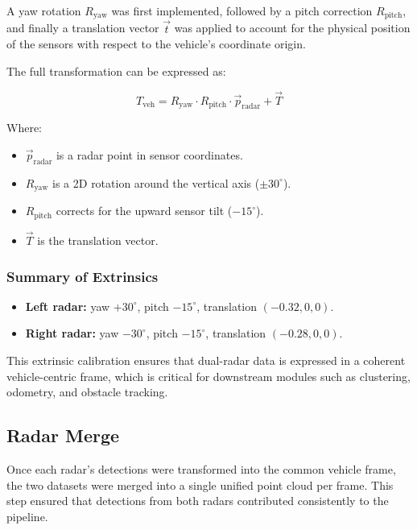 A yaw rotation \( R_{\text{yaw}} \) was first implemented, followed by a pitch correction \( R_{\text{pitch}} \), and finally a translation vector \( \vec{t} \) was applied to account for the physical position of the sensors with respect to the vehicle's coordinate origin.

The full transformation can be expressed as:

\begin{equation}
T_{\text{veh}} = R_{\text{yaw}} \cdot R_{\text{pitch}} \cdot \vec{p}_{\text{radar}} + \vec{T}
\label{eq:radar_to_vehicle_transform}
\end{equation}

Where:
\begin{itemize}
    \item \( \vec{p}_{\text{radar}} \) is a radar point in sensor coordinates.
    \item \( R_{\text{yaw}} \) is a 2D rotation around the vertical axis ($\pm30^\circ$).
    \item \( R_{\text{pitch}} \) corrects for the upward sensor tilt ($-15^\circ$).
    \item \( \vec{T} \) is the translation vector.
\end{itemize}

\subsubsection{Summary of Extrinsics}
\begin{itemize}
    \item \textbf{Left radar:} yaw $+30^\circ$, pitch $-15^\circ$, translation $(-0.32, 0, 0)$.
    \item \textbf{Right radar:} yaw $-30^\circ$, pitch $-15^\circ$, translation $(-0.28, 0, 0)$.
\end{itemize}

This extrinsic calibration ensures that dual-radar data is expressed in a coherent vehicle-centric frame, which is critical for downstream modules such as clustering, odometry, and obstacle tracking.

\vspace{0.5em}
\subsection{Radar Merge}  
\indent Once each radar's detections were transformed into the common vehicle frame, the two datasets were merged into a single unified point cloud per frame.  
This step ensured that detections from both radars contributed consistently to the pipeline.  


